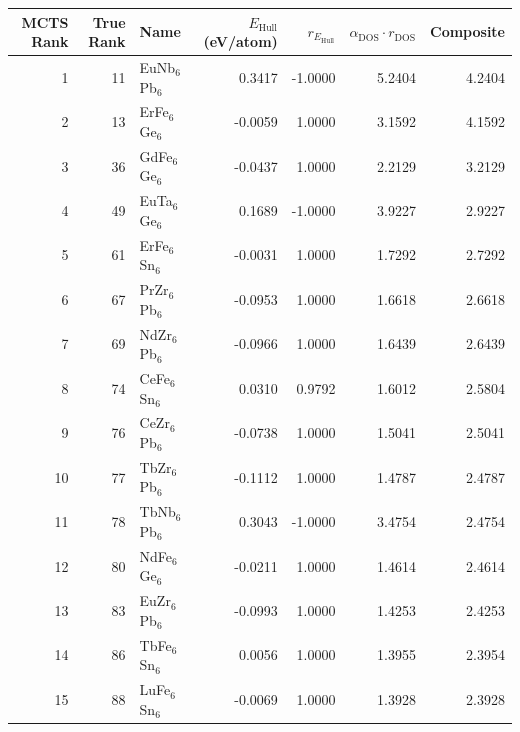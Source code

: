 \begin{tabular}{rrlrrrr}
\toprule
MCTS Rank & True Rank & Name & $E_{\mathrm{Hull}}$ (eV/atom) & $r_{E_{\mathrm{Hull}}}$ & $\alpha_{\mathrm{DOS}} \cdot r_{\mathrm{DOS}}$ & Composite \\
\midrule
1 & 11 & EuNb$_{6}$Pb$_{6}$ & 0.3417 & -1.0000 & 5.2404 & 4.2404 \\
2 & 13 & ErFe$_{6}$Ge$_{6}$ & -0.0059 & 1.0000 & 3.1592 & 4.1592 \\
3 & 36 & GdFe$_{6}$Ge$_{6}$ & -0.0437 & 1.0000 & 2.2129 & 3.2129 \\
4 & 49 & EuTa$_{6}$Ge$_{6}$ & 0.1689 & -1.0000 & 3.9227 & 2.9227 \\
5 & 61 & ErFe$_{6}$Sn$_{6}$ & -0.0031 & 1.0000 & 1.7292 & 2.7292 \\
6 & 67 & PrZr$_{6}$Pb$_{6}$ & -0.0953 & 1.0000 & 1.6618 & 2.6618 \\
7 & 69 & NdZr$_{6}$Pb$_{6}$ & -0.0966 & 1.0000 & 1.6439 & 2.6439 \\
8 & 74 & CeFe$_{6}$Sn$_{6}$ & 0.0310 & 0.9792 & 1.6012 & 2.5804 \\
9 & 76 & CeZr$_{6}$Pb$_{6}$ & -0.0738 & 1.0000 & 1.5041 & 2.5041 \\
10 & 77 & TbZr$_{6}$Pb$_{6}$ & -0.1112 & 1.0000 & 1.4787 & 2.4787 \\
11 & 78 & TbNb$_{6}$Pb$_{6}$ & 0.3043 & -1.0000 & 3.4754 & 2.4754 \\
12 & 80 & NdFe$_{6}$Ge$_{6}$ & -0.0211 & 1.0000 & 1.4614 & 2.4614 \\
13 & 83 & EuZr$_{6}$Pb$_{6}$ & -0.0993 & 1.0000 & 1.4253 & 2.4253 \\
14 & 86 & TbFe$_{6}$Sn$_{6}$ & 0.0056 & 1.0000 & 1.3955 & 2.3954 \\
15 & 88 & LuFe$_{6}$Sn$_{6}$ & -0.0069 & 1.0000 & 1.3928 & 2.3928 \\
\bottomrule
\end{tabular}
